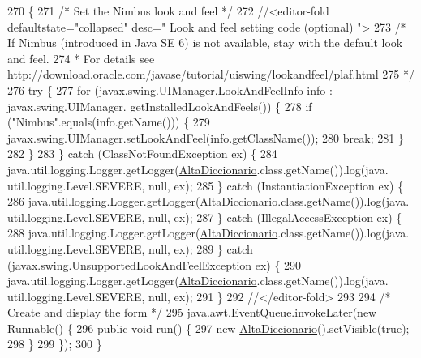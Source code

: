 \begin{DoxyCode}
270                                            \{
271         \textcolor{comment}{/* Set the Nimbus look and feel */}
272         \textcolor{comment}{//<editor-fold defaultstate="collapsed" desc=" Look and feel setting code (optional) ">}
273         \textcolor{comment}{/* If Nimbus (introduced in Java SE 6) is not available, stay with the default look and feel.}
274 \textcolor{comment}{         * For details see http://download.oracle.com/javase/tutorial/uiswing/lookandfeel/plaf.html }
275 \textcolor{comment}{         */}
276         \textcolor{keywordflow}{try} \{
277             \textcolor{keywordflow}{for} (javax.swing.UIManager.LookAndFeelInfo info : javax.swing.UIManager.
      getInstalledLookAndFeels()) \{
278                 \textcolor{keywordflow}{if} (\textcolor{stringliteral}{"Nimbus"}.equals(info.getName())) \{
279                     javax.swing.UIManager.setLookAndFeel(info.getClassName());
280                     \textcolor{keywordflow}{break};
281                 \}
282             \}
283         \} \textcolor{keywordflow}{catch} (ClassNotFoundException ex) \{
284             java.util.logging.Logger.getLogger(\mbox{\hyperlink{class_interfaz_package_1_1_alta_diccionario_aca3c4675d4f19e6226268ada6f573ae3}{AltaDiccionario}}.class.getName()).log(java.
      util.logging.Level.SEVERE, null, ex);
285         \} \textcolor{keywordflow}{catch} (InstantiationException ex) \{
286             java.util.logging.Logger.getLogger(\mbox{\hyperlink{class_interfaz_package_1_1_alta_diccionario_aca3c4675d4f19e6226268ada6f573ae3}{AltaDiccionario}}.class.getName()).log(java.
      util.logging.Level.SEVERE, null, ex);
287         \} \textcolor{keywordflow}{catch} (IllegalAccessException ex) \{
288             java.util.logging.Logger.getLogger(\mbox{\hyperlink{class_interfaz_package_1_1_alta_diccionario_aca3c4675d4f19e6226268ada6f573ae3}{AltaDiccionario}}.class.getName()).log(java.
      util.logging.Level.SEVERE, null, ex);
289         \} \textcolor{keywordflow}{catch} (javax.swing.UnsupportedLookAndFeelException ex) \{
290             java.util.logging.Logger.getLogger(\mbox{\hyperlink{class_interfaz_package_1_1_alta_diccionario_aca3c4675d4f19e6226268ada6f573ae3}{AltaDiccionario}}.class.getName()).log(java.
      util.logging.Level.SEVERE, null, ex);
291         \}
292         \textcolor{comment}{//</editor-fold>}
293 
294         \textcolor{comment}{/* Create and display the form */}
295         java.awt.EventQueue.invokeLater(\textcolor{keyword}{new} Runnable() \{
296             \textcolor{keyword}{public} \textcolor{keywordtype}{void} run() \{
297                 \textcolor{keyword}{new} \mbox{\hyperlink{class_interfaz_package_1_1_alta_diccionario_aca3c4675d4f19e6226268ada6f573ae3}{AltaDiccionario}}().setVisible(\textcolor{keyword}{true});
298             \}
299         \});
300     \}
\end{DoxyCode}


